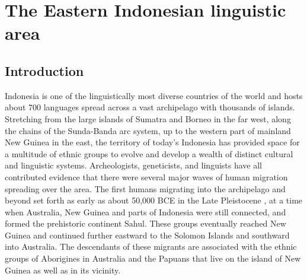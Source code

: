 \chapter{The Eastern Indonesian linguistic area}\label{ch:area}

\section{Introduction} \label{sec:area_intro}
Indonesia is one of the linguistically most diverse countries of the world and hosts about 700 languages spread across a vast archipelago with thousands of islands. Stretching from the large islands of Sumatra and Borneo in the far west, along the chains of the Sunda-Banda arc system, up to the western part of mainland New Guinea in the east, the territory of today's Indonesia has provided space for a multitude of ethnic groups to evolve and develop a wealth of distinct cultural and linguistic systems. Archeologists, geneticists, and linguists have all contributed evidence that there were several major waves of human migration spreading over the area. The first humans migrating into the archipelago and beyond set forth as early as about 50,000 BCE in the Late Pleistocene \citep{capelli2001}, at a time when Australia, New Guinea and parts of Indonesia were still connected, and formed the prehistoric continent Sahul. These groups eventually reached New Guinea and continued further eastward to the Solomon Islands and southward into Australia. The descendants of these migrants are associated with the ethnic groups of Aborigines in Australia and the Papuans that live on the island of New Guinea as well as in its vicinity. 

